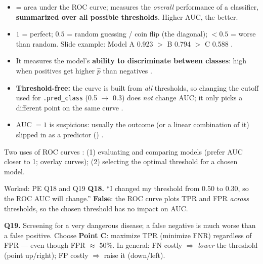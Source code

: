 \begin{keybox}
\begin{itemize}
\item {} = area under the ROC curve; measures the \emph{overall} performance of a classifier,
  \textbf{summarized over all possible thresholds}. Higher AUC, the better.
\item $1$ = perfect; $0.5$ = random guessing / coin flip (the diagonal); $<0.5$ = worse than random.
  Slide example: Model A 0.923 $>$ B 0.794 $>$ C 0.588 .
\item It measures the model's \textbf{ability to discriminate between classes}: high when positives get
  higher $\hat p$ than negatives .
\item \textbf{Threshold-free:} the curve is built from \emph{all} thresholds, so changing the cutoff used for
  \texttt{.pred\_class} (0.5 $\to$ 0.3) does \emph{not} change AUC; it only picks a different point on the
  same curve .
\item AUC $=1$ is suspicious: usually the outcome (or a linear combination of it) slipped in as a predictor
  () .
\end{itemize}
Two uses of ROC curves : (1) evaluating and comparing models (prefer AUC closer to 1; overlay curves);
(2) selecting the optimal threshold for a chosen model.
\end{keybox}

\begin{qbox}{Worked: PE Q18 and Q19}
\textbf{Q18.} ``I changed my threshold from 0.50 to 0.30, so the ROC AUC will change.'' \textbf{False}: the ROC
curve plots TPR and FPR \emph{across} thresholds, so the chosen threshold has no impact on AUC.
\par\textbf{Q19.} Screening for a very dangerous disease; a false negative is much worse than a false positive.
Choose \textbf{Point C}: maximize TPR (minimize FNR) regardless of FPR --- even though FPR $\approx$ 50\%. In general:
FN costly $\Rightarrow$ \emph{lower} the threshold (point up/right); FP costly $\Rightarrow$ raise it (down/left). 
\end{qbox}

